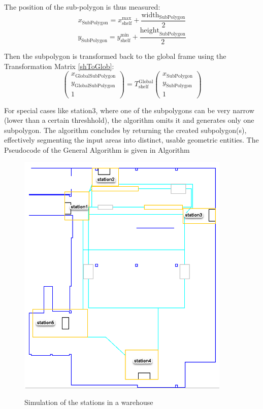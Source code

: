 The position of the sub-polygon is thus measured:
\begin{equation}
x_{\text{SubPolygon}} = x_{\text{shelf}}^{\text{max}} + \frac{\text{width}_{\text{SubPolygon}}}{2}
\end{equation}
\begin{equation}
y_{\text{SubPolygon}} = y_{\text{shelf}}^{\text{min}} + \frac{\text{height}_{\text{SubPolygon}}}{2}
\end{equation}

Then the subpolygon is transformed back to the global frame using the Transformation 
Matrix \ref{shToGlob}:
\begin{equation}
\begin{pmatrix}
x_{\text{GlobalSubPolygon}} \\
y_{\text{GlobalSubPolygon}} \\
1
\end{pmatrix}
=
T_{\text{shelf}}^{\text{Global}}
\begin{pmatrix}
x_{\text{SubPolygon}} \\
y_{\text{SubPolygon}} \\
1
\end{pmatrix}
\end{equation}


For special cases like station3, where one of the subpolygons can be very narrow (lower than a 
certain threshhold), the algorithm omits it and generates only one subpolygon. 
The algorithm concludes by returning the created subpolygon(s), effectively segmenting the 
input areas into distinct, usable geometric entities.
The Pseudocode of the General Algorithm is given in Algorithm 


\begin{figure}[H]
    \begin{center}
        \includegraphics[width=4in]{images/Chap2/warehouse.png}\\
        \caption{Simulation of the stations in a warehouse}
        \label{warehouse}
        \end{center}    
\end{figure}


